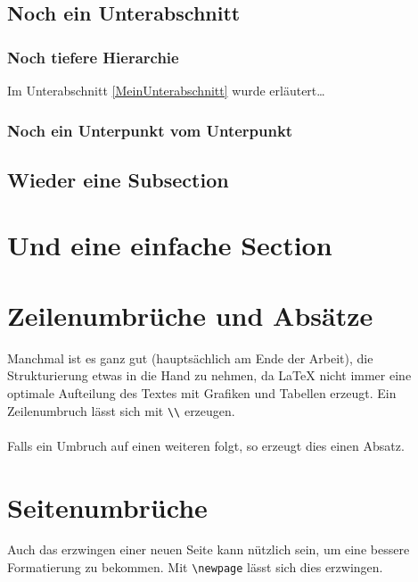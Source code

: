 \subsection{Noch ein Unterabschnitt}

\subsubsection{Noch tiefere Hierarchie}

Im Unterabschnitt \ref{MeinUnterabschnitt} wurde erläutert\ldots

\subsubsection{Noch ein Unterpunkt vom Unterpunkt}

\subsection{Wieder eine Subsection}

\section{Und eine einfache Section}

\section{Zeilenumbrüche und Absätze}

Manchmal ist es ganz gut (hauptsächlich am Ende der Arbeit), die Strukturierung etwas in die Hand zu nehmen,
da LaTeX nicht immer eine optimale Aufteilung des Textes mit Grafiken und Tabellen erzeugt. 
Ein Zeilenumbruch lässt sich mit \verb|\\| erzeugen.\\
\\ 
Falls ein Umbruch auf einen weiteren folgt, so erzeugt dies einen Absatz.                                      

\section{Seitenumbrüche}

Auch das erzwingen einer neuen Seite kann nützlich sein, um eine bessere Formatierung zu bekommen.
Mit \verb|\newpage| lässt sich dies erzwingen.